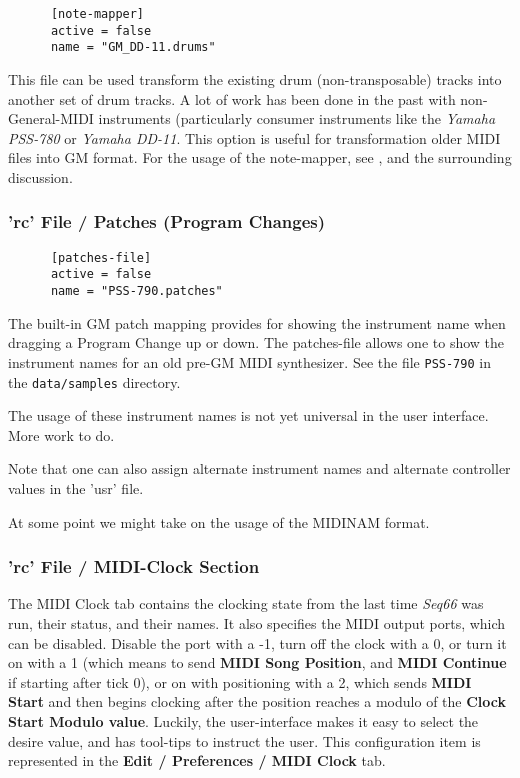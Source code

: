    \begin{verbatim}
      [note-mapper]
      active = false
      name = "GM_DD-11.drums"
   \end{verbatim}

   This file can be used transform the existing drum (non-transposable) tracks
   into another set of drum tracks.  A lot of work has been done in the past
   with non-General-MIDI instruments (particularly consumer instruments like the
   \textsl{Yamaha PSS-780} or \textsl{Yamaha DD-11}.
   This option is useful for transformation older MIDI files into GM format.
   For the usage of the note-mapper, see
   , and the surrounding
   discussion.

\subsubsection{'rc' File / Patches (Program Changes)}
\label{subsubsec:configuration_rc_patches}

   \begin{verbatim}
      [patches-file]
      active = false
      name = "PSS-790.patches"
   \end{verbatim}

   The built-in GM patch mapping provides for showing the instrument
   name when dragging a Program Change up or down. The patches-file
   allows one to show the instrument names for an old pre-GM
   MIDI synthesizer. See the file \texttt{PSS-790} in the 
   \texttt{data/samples} directory.

   The usage of these instrument names is not yet universal in the user
   interface. More work to do.

   Note that one can also assign alternate instrument names and alternate
   controller values in the 'usr' file.

   At some point we might take on the usage of the MIDINAM format.

\subsubsection{'rc' File / MIDI-Clock Section}
\label{subsec:configuration_rc_midi_clock}

   The MIDI Clock tab contains the clocking state from the last 
   time \textsl{Seq66} was run, their status, and their names.
   It also specifies the MIDI output ports, which can be disabled.
   Disable the port with a -1, turn off the clock with a 0,
   or turn it on with a 1 (which means to send
   \textbf{MIDI Song Position}, and
   \textbf{MIDI Continue} if
   starting after tick 0), or on with positioning with a 2, which sends
   \textbf{MIDI Start}
   and then begins clocking after the position reaches a modulo of the
   \textbf{Clock Start Modulo value}.  Luckily, the user-interface makes it
   easy to select the desire value, and has tool-tips to instruct the user.
   This configuration item is represented in the
   \textbf{Edit / Preferences / MIDI Clock} tab.

